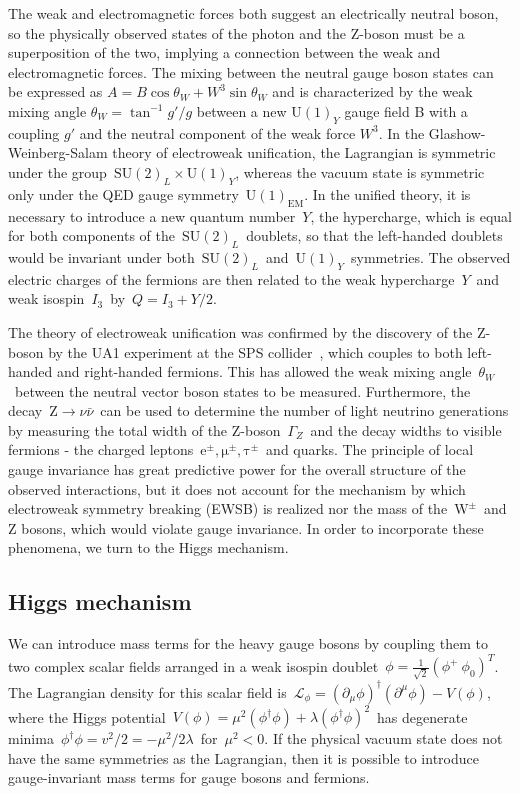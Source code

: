 The weak and electromagnetic forces both suggest an electrically neutral boson, so the physically observed states of the photon and the Z-boson must be a superposition of the two, implying a connection between the weak and electromagnetic forces. The mixing between the neutral gauge boson states can be expressed as $A = B \cos{\theta_W} + W^3 \sin{\theta_W}$ and is characterized by the weak mixing angle $\theta_W = \tan^{-1}{g'/g}$ between a new $\mathrm{U}(1)_Y$ gauge field B with a coupling $g'$ and the neutral component of the weak force $W^3$. In the Glashow-Weinberg-Salam theory of electroweak unification, the Lagrangian is symmetric under the group~$\mathrm{SU}(2)_L \times \mathrm{U}(1)_Y$, whereas the vacuum state is symmetric only under the QED gauge symmetry~$\mathrm{U}(1)_{\mathrm{EM}}$. In the unified theory, it is necessary to introduce a new quantum number~$Y$, the hypercharge, which is equal for both components of the~$\mathrm{SU}(2)_L$~doublets, so that the left-handed doublets would be invariant under both~$\mathrm{SU}(2)_L$~and~$\mathrm{U}(1)_Y$~symmetries. The observed electric charges of the fermions are then related to the weak hypercharge~$Y$~and weak isospin~$I_3$~by~$Q = I_3 + Y/2$.

The theory of electroweak unification was confirmed by the discovery of the Z-boson by the UA1 experiment at the SPS collider~\cite{Arnison:1983mk}, which couples to both left-handed and right-handed fermions. This has allowed the weak mixing angle~$\theta_W$~between the neutral vector boson states to be measured. Furthermore, the decay~$\mathrm{Z} \rightarrow \nu \bar{\nu}$~can be used to determine the number of light neutrino generations by measuring the total width of the Z-boson~$\Gamma_Z$~and the decay widths to visible fermions - the charged leptons~$\mathrm{e}^\pm, \mathrm{\mu}^\pm, \mathrm{\tau}^\pm$~and quarks. The principle of local gauge invariance has great predictive power for the overall structure of the observed interactions, but it does not account for the mechanism by which electroweak symmetry breaking (EWSB) is realized nor the mass of the~$\mathrm{W}^\pm$~and Z bosons, which would violate gauge invariance. In order to incorporate these phenomena, we turn to the Higgs mechanism.

\subsection{Higgs mechanism}
We can introduce mass terms for the heavy gauge bosons by coupling them to two complex scalar fields arranged in a weak isospin doublet~$\phi = \frac{1}{\sqrt{2}} (\phi^+\ \phi_0)^T$. The Lagrangian density for this scalar field is~$\mathcal{L}_{\phi} = (\partial_\mu \phi)^\dagger (\partial^\mu \phi) - V(\phi)$, where the Higgs potential~$V(\phi) = \mu^2 (\phi^\dagger \phi) + \lambda (\phi^\dagger \phi)^2$~has degenerate minima~$\phi^\dagger \phi = v^2 / 2 = -\mu^2/2\lambda$~for~$\mu^2 < 0$. If the physical vacuum state does not have the same symmetries as the Lagrangian, then it is possible to introduce gauge-invariant mass terms for gauge bosons and fermions.

